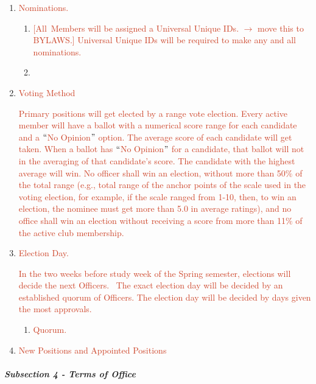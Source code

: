 \documentclass[12pt]{report}
\begin{document}
\begin{enumerate}[label*={\fontsize{12pt}{12pt}\selectfont \arabic*.}]
	\item \textcolor[HTML]{CC4125}{Nominations.}\par

\begin{enumerate}[label*={\fontsize{12pt}{12pt}\selectfont \arabic*.}]
	\item \textcolor[HTML]{CC4125}{[All\ Members will be assigned a Universal Unique IDs. $ \rightarrow $  move this to BYLAWS.]  Universal Unique IDs will be required to make any and all nominations.}\par

	\item \par


\vspace{\baselineskip}

\end{enumerate}
	\item \textcolor[HTML]{CC4125}{Voting Method }\par

\textcolor[HTML]{CC4125}{Primary positions will get elected by a range vote election. Every active member will have a ballot with a numerical score range for each candidate and a $``$No Opinion$"$  option. The average score of each candidate will get taken. When a ballot has $``$No Opinion$"$  for a candidate, that ballot will not  in the averaging of that candidate’s score. The candidate with the highest average will win. No officer shall win an election, without more than 50$\%$  of the total range (e.g., total range of the anchor points of the scale used in the voting election, for example, if the scale ranged from 1-10, then, to win an election, the nominee must get more than 5.0 in average ratings), and no office shall win an election without receiving a score from more than 11$\%$  of the active club membership.}\par

	\item \textcolor[HTML]{CC4125}{Election Day. }\par

\textcolor[HTML]{CC4125}{ In the two weeks before study week of the Spring semester, elections will decide the next Officers. }\textcolor[HTML]{CC4125}{\ The exact election day will be decided by an established quorum of Officers.  The election day will be decided by days given the most approvals.}\par

\begin{enumerate}[label*={\fontsize{12pt}{12pt}\selectfont \arabic*.}]
	\item \textcolor[HTML]{CC4125}{Quorum.\  }\par


\end{enumerate}
	\item \textcolor[HTML]{CC4125}{New Positions and Appointed Positions}\par


\end{enumerate}\subparagraph{Subsection 4 - Terms of Office}
\end{document}
